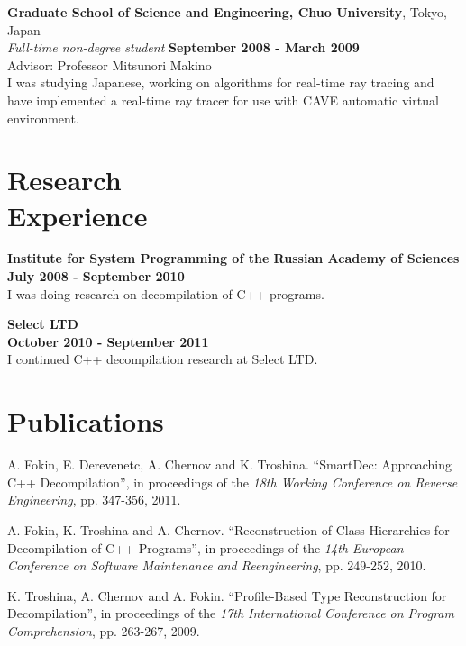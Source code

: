 \documentclass[margin,line]{CV}
\begin{document}
\begin{resume}
    \textbf{Graduate School of Science and Engineering, Chuo University}, Tokyo, Japan \vspace{2mm}\\\vspace{1mm}%
    \textsl{Full-time non-degree student} \hfill \textbf{September 2008 - March 2009}\vspace{1mm}\\
    Advisor: Professor Mitsunori Makino \\
	I was studying Japanese, working on algorithms for real-time ray tracing and have implemented a real-time ray tracer for use with CAVE automatic virtual environment.

    \section{\mysidestyle Research\\Experience}
    \textbf{Institute for System Programming of the Russian Academy of Sciences} \vspace{2mm}\\\vspace{1mm}%
    \hfill \textbf{July 2008 - September 2010}\\
    I was doing research on decompilation of C++ programs.

    \textbf{Select LTD} \vspace{2mm}\\\vspace{1mm}%
    \hfill \textbf{October 2010 - September 2011}\\
    I continued C++ decompilation research at Select LTD.

    \section{\mysidestyle Publications}
    A. Fokin, E. Derevenetc, A. Chernov and K. Troshina. ``SmartDec: Approaching C++ Decompilation'',
	in proceedings of the \textsl{18th Working Conference on Reverse Engineering}, pp. 347-356, 2011.
	
	A. Fokin, K. Troshina and A. Chernov. ``Reconstruction of Class Hierarchies for Decompilation of C++ Programs'',
    in proceedings of the \textsl{14th European Conference on Software Maintenance and Reengineering}, pp. 249-252, 2010.

    K. Troshina, A. Chernov and A. Fokin. ``Profile-Based Type Reconstruction for Decompilation'',
    in proceedings of the \textsl{17th International Conference on Program Comprehension}, pp. 263-267, 2009.



\end{resume}
\end{document}
